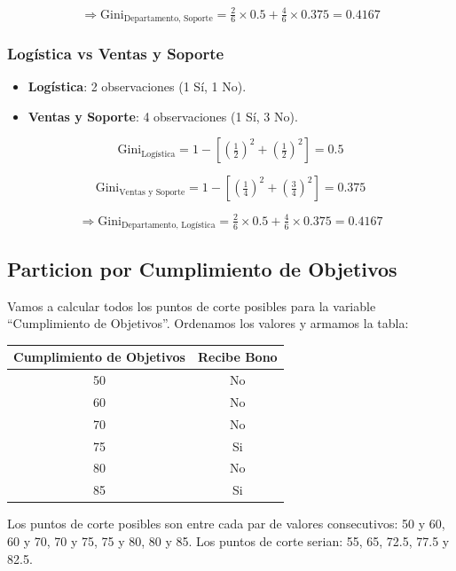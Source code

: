 \documentclass[12pt]{article}
\begin{document}
\[
  \Rightarrow \mathrm{Gini}_{\text{Departamento, Soporte}} = \tfrac{2}{6}\times0.5 + \tfrac{4}{6}\times0.375 = 0.4167
\]

\subsubsection{Logística vs Ventas y Soporte}

\begin{itemize}
  \item \textbf{Logística}: 2 observaciones (1 Sí, 1 No).
  \item \textbf{Ventas y Soporte}: 4 observaciones (1 Sí, 3 No).
\end{itemize}

\[
  \mathrm{Gini}_{\text{Logística}} = 1 - \left[\left(\tfrac{1}{2}\right)^2 + \left(\tfrac{1}{2}\right)^2\right] = 0.5
\]

\[
  \mathrm{Gini}_{\text{Ventas y Soporte}} = 1 - \left[\left(\tfrac{1}{4}\right)^2 + \left(\tfrac{3}{4}\right)^2\right] = 0.375
\]

\[
  \Rightarrow \mathrm{Gini}_{\text{Departamento, Logística}} = \tfrac{2}{6}\times0.5 + \tfrac{4}{6}\times0.375 = 0.4167
\]

\subsection{Particion por Cumplimiento de Objetivos}

Vamos a calcular todos los puntos de corte posibles para la variable ``Cumplimiento de Objetivos''. Ordenamos los valores y armamos la tabla:

\begin{table}[h]
  \centering
  \begin{tabular}{cc}
    \toprule
    Cumplimiento de Objetivos & Recibe Bono \\
    \midrule
    50 & No \\
    60 & No \\
    70 & No \\
    75 & Si \\
    80 & No \\
    85 & Si \\
    \bottomrule
  \end{tabular}
\end{table}

Los puntos de corte posibles son entre cada par de valores consecutivos: 50 y 60, 60 y 70, 70 y 75, 75 y 80, 80 y 85. Los puntos de corte serian: 55, 65, 72.5, 77.5 y 82.5.
\end{document}
